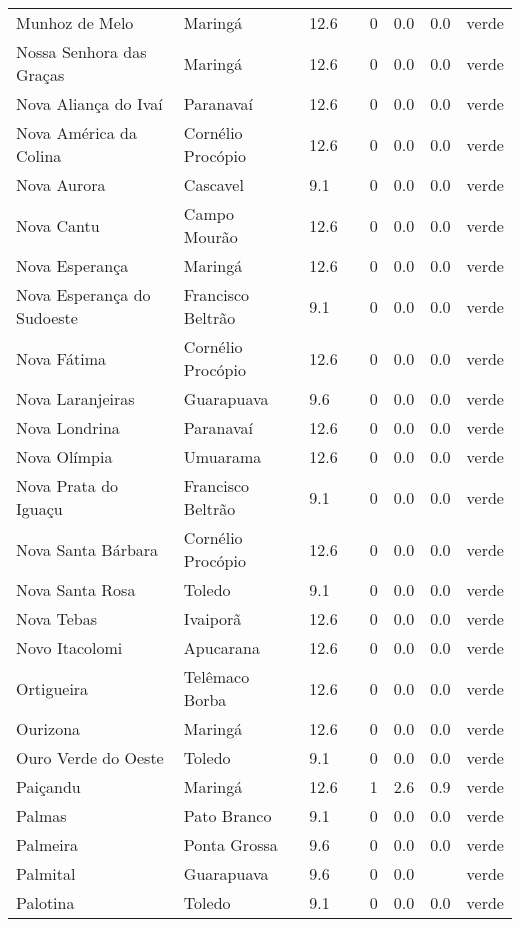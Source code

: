 \begin{longtable}{l|lllllll}
  Munhoz de Melo & Maringá & 12.6 &  & 0 & 0.0 & 0.0 & verde \\ 
  Nossa Senhora das Graças & Maringá & 12.6 &  & 0 & 0.0 & 0.0 & verde \\ 
  Nova Aliança do Ivaí & Paranavaí & 12.6 &  & 0 & 0.0 & 0.0 & verde \\ 
  Nova América da Colina & Cornélio Procópio & 12.6 &  & 0 & 0.0 & 0.0 & verde \\ 
  Nova Aurora & Cascavel & 9.1 &  & 0 & 0.0 & 0.0 & verde \\ 
  Nova Cantu & Campo Mourão & 12.6 &  & 0 & 0.0 & 0.0 & verde \\ 
  Nova Esperança & Maringá & 12.6 &  & 0 & 0.0 & 0.0 & verde \\ 
  Nova Esperança do Sudoeste & Francisco Beltrão & 9.1 &  & 0 & 0.0 & 0.0 & verde \\ 
  Nova Fátima & Cornélio Procópio & 12.6 &  & 0 & 0.0 & 0.0 & verde \\ 
  Nova Laranjeiras & Guarapuava & 9.6 &  & 0 & 0.0 & 0.0 & verde \\ 
  Nova Londrina & Paranavaí & 12.6 &  & 0 & 0.0 & 0.0 & verde \\ 
  Nova Olímpia & Umuarama & 12.6 &  & 0 & 0.0 & 0.0 & verde \\ 
  Nova Prata do Iguaçu & Francisco Beltrão & 9.1 &  & 0 & 0.0 & 0.0 & verde \\ 
  Nova Santa Bárbara & Cornélio Procópio & 12.6 &  & 0 & 0.0 & 0.0 & verde \\ 
  Nova Santa Rosa & Toledo & 9.1 &  & 0 & 0.0 & 0.0 & verde \\ 
  Nova Tebas & Ivaiporã & 12.6 &  & 0 & 0.0 & 0.0 & verde \\ 
  Novo Itacolomi & Apucarana & 12.6 &  & 0 & 0.0 & 0.0 & verde \\ 
  Ortigueira & Telêmaco Borba & 12.6 &  & 0 & 0.0 & 0.0 & verde \\ 
  Ourizona & Maringá & 12.6 &  & 0 & 0.0 & 0.0 & verde \\ 
  Ouro Verde do Oeste & Toledo & 9.1 &  & 0 & 0.0 & 0.0 & verde \\ 
  Paiçandu & Maringá & 12.6 &  & 1 & 2.6 & 0.9 & verde \\ 
  Palmas & Pato Branco & 9.1 &  & 0 & 0.0 & 0.0 & verde \\ 
  Palmeira & Ponta Grossa & 9.6 &  & 0 & 0.0 & 0.0 & verde \\ 
  Palmital & Guarapuava & 9.6 &  & 0 & 0.0 &  & verde \\ 
  Palotina & Toledo & 9.1 &  & 0 & 0.0 & 0.0 & verde \\ 

\end{longtable}
